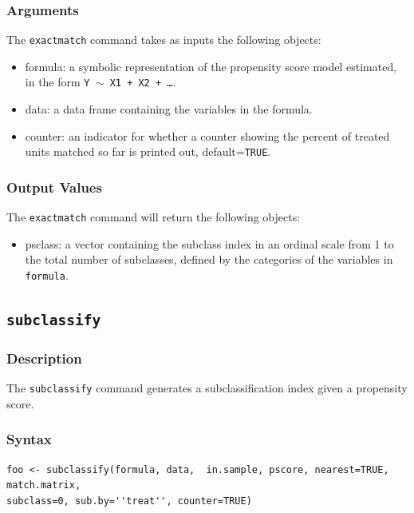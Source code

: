 \documentclass[oneside,letterpaper,titlepage]{article}
\begin{document}
\begin{appendix}
\subsubsection{Arguments}
The \texttt{exactmatch} command takes as inputs the following
objects:
\begin{itemize}
\item{formula}:  a symbolic representation of the propensity score model estimated, in the form {\tt Y $\sim$ X1 + X2 + \dots}.
\item{data}: a data frame containing the variables in the formula.
\item{counter}: an indicator for whether a counter showing the percent of treated units matched so far is printed out, default={\tt TRUE}.
\end{itemize}

\subsubsection{Output Values}
The \texttt{exactmatch} command will return the following objects: 
\begin{itemize}
\item{psclass}: a vector containing the subclass index in an ordinal scale
  from 1 to the total number of subclasses, defined by the categories of the variables in {\tt formula}.
\end{itemize}

\subsection{\texttt{subclassify}}

\subsubsection{Description}
The \texttt{subclassify} command generates a subclassification index
given a propensity score. 

\subsubsection{Syntax}
\begin{verbatim}
foo <- subclassify(formula, data,  in.sample, pscore, nearest=TRUE, match.matrix,
subclass=0, sub.by=''treat'', counter=TRUE)
\end{verbatim} 


\end{appendix}
\end{document}
